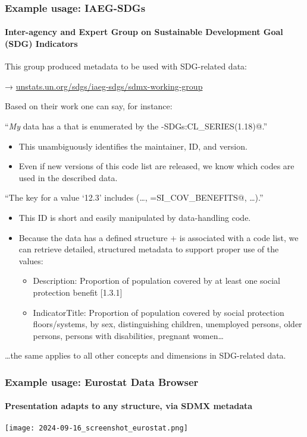 \documentclass[12pt,aspectratio=169]{beamer}
\begin{document}
\begin{frame}
\frametitle{Example usage: IAEG-SDGs}
\framesubtitle{Inter-agency and Expert Group on Sustainable Development Goal (SDG) Indicators}

This group produced metadata to be used with SDG-related data:

→ \href{https://unstats.un.org/sdgs/iaeg-sdgs/sdmx-working-group/}{unstats.un.org/sdgs/iaeg-sdgs/sdmx-working-group}

\bigskip
Based on their work one can say, for instance:

\medskip
“\emph{My} data has a  \verb@SERIES@ that is enumerated by the  \verb@IAEG-SDGs:CL_SERIES(1.18)@.”
\begin{itemize}
  \item This unambiguously identifies the maintainer, ID, and version.
  \item Even if new versions of this code list are released, we know which codes are used in the described data.
\end{itemize}

\framebreak
\medskip
“The key for a value ‘12.3’ includes (…, \verb@SERIES=SI_COV_BENEFITS@, …).”
\begin{itemize}
  \item This ID is short and easily manipulated by data-handling code.
  \item Because the data has a defined structure + is associated with a code list, we can retrieve detailed, structured metadata to support proper use of the values:
  \begin{itemize}
    \item Description: Proportion of population covered by at least one social protection benefit [1.3.1]
    \item IndicatorTitle: Proportion of population covered by social protection floors/systems, by sex, distinguishing children, unemployed persons, older persons, persons with disabilities, pregnant women…
  \end{itemize}
\end{itemize}
…the same applies to all other concepts and dimensions in SDG-related data.
\end{frame}

\begin{frame}
\frametitle{Example usage: Eurostat Data Browser}
\framesubtitle{Presentation adapts to \textbf{any} structure, via SDMX metadata}
\texttt{[image: 2024-09-16\_screenshot\_eurostat.png]}
\end{frame}
\end{document}
